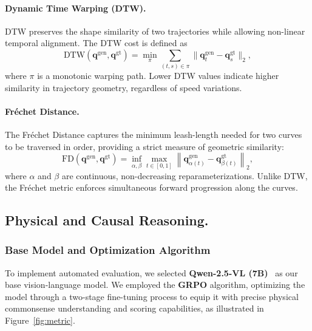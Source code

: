 \paragraph{Dynamic Time Warping (DTW).}
DTW preserves the shape similarity of two trajectories while allowing non-linear temporal alignment. The DTW cost is defined as
\[
    \mathrm{DTW}(\mathbf{q}^{\text{gen}}, \mathbf{q}^{\text{gt}})
    =
    \min_{\pi}
    \sum_{(t, s)\in \pi}
    \big\|
        \mathbf{q}_t^{\text{gen}}
        -
        \mathbf{q}_s^{\text{gt}}
    \big\|_2,
\]
where $\pi$ is a monotonic warping path. Lower DTW values indicate higher similarity in trajectory geometry, regardless of speed variations.

\paragraph{Fréchet Distance.}
The Fréchet Distance captures the minimum leash-length needed for two curves to be traversed in order, providing a strict measure of geometric similarity:
\[
    \mathrm{FD}(\mathbf{q}^{\text{gen}}, \mathbf{q}^{\text{gt}})
    =
    \inf_{\alpha,\beta}
    \max_{t \in [0,1]}
    \left\|
        \mathbf{q}^{\text{gen}}_{\alpha(t)}
        -
        \mathbf{q}^{\text{gt}}_{\beta(t)}
    \right\|_2,
\]
where $\alpha$ and $\beta$ are continuous, non-decreasing reparameterizations. Unlike DTW, the Fréchet metric enforces simultaneous forward progression along the curves.


\subsection{Physical and Causal Reasoning.}


    \subsubsection*{Base Model and Optimization Algorithm}
To implement automated evaluation, we selected \textbf{Qwen-2.5-VL (7B)}~\cite{bai2025qwen25vltechnicalreport} as our base vision-language model. We employed the \textbf{GRPO} algorithm, optimizing the model through a two-stage fine-tuning process to equip it with precise physical commonsense understanding and scoring capabilities, as illustrated in Figure~\ref{fig:metric}.

